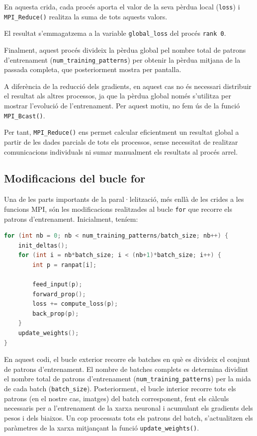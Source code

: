 \documentclass{article}
\begin{document}
En aquesta crida, cada procés aporta el valor
de la seva pèrdua local (\texttt{loss}) i
\texttt{MPI\_Reduce()} realitza la suma de
tots aquests valors.

El resultat s'emmagatzema a la variable
\texttt{global\_loss} del procés
\texttt{rank 0}.

Finalment, aquest procés divideix
la pèrdua global pel nombre total de
patrons d'entrenament
(\texttt{num\_training\_patterns})
per obtenir la pèrdua mitjana de la passada completa,
que posteriorment mostra per pantalla.

A diferència de la reducció dels gradients,
en aquest cas no és necessari distribuir
el resultat als altres processos, ja que
la pèrdua global només s'utilitza per
mostrar l'evolució de l'entrenament. Per
aquest motiu, no fem ús de la funció
\texttt{MPI\_Bcast()}.

Per tant, \texttt{MPI\_Reduce()} ens permet
calcular eficientment un resultat global
a partir de les dades parcials de tots
els processos, sense necessitat de
realitzar comunicacions individuals ni
sumar manualment els resultats al procés
arrel.

\subsection{Modificacions del bucle for}

Una de les parts importants de la paral·lelització, més enllà de les crides a les funcions MPI, són les modificacions realitzades al bucle \texttt{for} que recorre els patrons d'entrenament. Inicialment, teníem:

\begin{lstlisting}[language=C]
for (int nb = 0; nb < num_training_patterns/batch_size; nb++) {
    init_deltas();
    for (int i = nb*batch_size; i < (nb+1)*batch_size; i++) {
        int p = ranpat[i];

        feed_input(p);
        forward_prop();
        loss += compute_loss(p);
        back_prop(p);
    }
    update_weights();
}
\end{lstlisting}

En aquest codi, el bucle exterior recorre els batches en què es divideix el conjunt de patrons d'entrenament. El nombre de batches complets es determina dividint el nombre total de patrons d'entrenament
(\texttt{num\_training\_patterns}) per la mida de cada batch (\texttt{batch\_size}). Posteriorment, el bucle interior recorre tots els patrons (en el nostre cas, imatges) del batch corresponent, fent els càlculs necessaris per a l'entrenament de la xarxa neuronal i acumulant els gradients dels pesos i dels biaixos. Un cop processats tots els patrons del batch, s'actualitzen els paràmetres de la xarxa mitjançant la funció \texttt{update\_weights()}.
\end{document}
